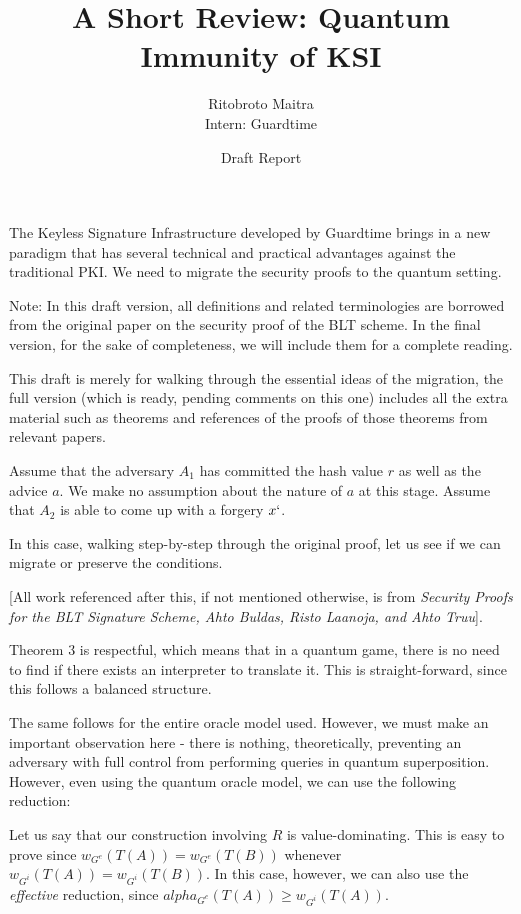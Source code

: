 \documentclass[10pt,a4paper]{article}
\author{Ritobroto Maitra\\ Intern: Guardtime}
\title{A Short Review: Quantum Immunity of KSI}
\date{Draft Report}
\begin{document}
\maketitle

\section{}

The Keyless Signature Infrastructure developed by Guardtime brings in a new paradigm that has several technical and practical advantages against the traditional PKI. We need to migrate the security proofs to the quantum setting.

Note: In this draft version, all definitions and related terminologies are borrowed from the original paper on the security proof of the BLT scheme. In the final version, for the sake of completeness, we will include them for a complete reading. 

This draft is merely for walking through the essential ideas of the migration, the full version (which is ready, pending comments on this one) includes all the extra material such as theorems and references of the proofs of those theorems from relevant papers. 


Assume that the adversary $A_1$ has committed the hash value $r$ as well as the advice $a$. We make no assumption about the nature of $a$ at this stage. Assume that $A_2$ is able to come up with a forgery $x`$.

In this case, walking step-by-step through the original proof, let us see if we can migrate or preserve the conditions.

[All work referenced after this, if not mentioned otherwise, is from \textit{Security Proofs for the BLT Signature Scheme, Ahto Buldas, Risto Laanoja, and Ahto Truu}].

Theorem 3 is respectful, which means that in a quantum game, there is no need to find if there exists an interpreter to translate it. This is straight-forward, since this follows a balanced structure.

The same follows for the entire oracle model used. However, we must make an important observation here - there is nothing, theoretically, preventing an adversary with full control from performing queries in quantum superposition. However, even using the quantum oracle model, we can use the following reduction:

Let us say that our construction involving $R$ is value-dominating. This is easy to prove since $w_{G^e}(T(A)) = w_{G^e}(T(B))$ whenever $w_{G^i}(T(A)) = w_{G^i}(T(B))$. In this case, however, we can also use the \textit{effective} reduction, since $alpha_{G^e}(T(A)) \geq w_{G^i}(T(A))$.
\end{document}
